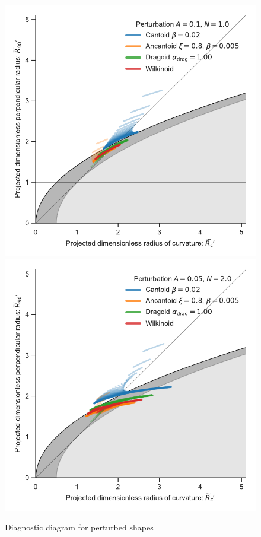 \begin{figure}
  \centering
  \includegraphics[width=\linewidth]
  {figs/wave-R90-vs-Rc-A010-N10}
  \includegraphics[width=\linewidth]
  {figs/wave-R90-vs-Rc-A005-N20}
  \caption{Diagnostic diagram for perturbed shapes}
  \label{fig:perturb-Rc-R90}
\end{figure}


